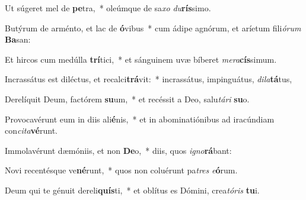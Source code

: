 \item Ut súgeret mel de \textbf{pe}tra,~* oleúmque de sa\textit{xo} \textit{du}\textbf{rís}simo.
\item Butýrum de arménto, et lac de \textbf{ó}vibus~* cum ádipe agnórum, et aríetum fili\textit{ó}\textit{rum} \textbf{Ba}san:
\item Et hircos cum medúlla \textbf{trí}tici,~* et sánguinem uvæ bíberet \textit{me}\textit{ra}\textbf{cís}simum.
\item Incrassátus est diléctus, et recalci\textbf{trá}vit:~* incrassátus, impinguátus, \textit{di}\textit{la}\textbf{tá}tus,
\item Derelíquit Deum, factórem \textbf{su}um,~* et recéssit a Deo, salu\textit{tá}\textit{ri} \textbf{su}o.
\item Provocavérunt eum in diis ali\textbf{é}nis,~* et in abominatiónibus ad iracúndiam con\textit{ci}\textit{ta}\textbf{vé}runt.
\item Immolavérunt dæmóniis, et non \textbf{De}o,~* diis, quos \textit{i}\textit{gno}\textbf{rá}bant:
\item Novi recentésque ve\textbf{né}runt,~* quos non coluérunt pa\textit{tres} \textit{e}\textbf{ó}rum.
\item Deum qui te génuit dereli\textbf{quís}ti,~* et oblítus es Dómini, crea\textit{tó}\textit{ris} \textbf{tu}i.
